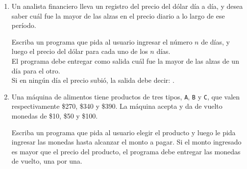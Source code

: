 \documentclass[11pt,spanish]{article}
\newcommand{\pond}[1]{[{\small\textbf{#1\%}}]}
\begin{document}
\begin{enumerate}[font=\Large\bfseries]
    \newpage
    \item
      \pond{25}
      Un analista financiero
      lleva un registro del precio del dólar día a día,
      y desea saber cuál fue la mayor de las alzas en el precio diario
      a lo largo de ese período.

      \begin{minipage}[t]{.43\textwidth}
        Escriba un programa que pida al usuario
        ingresar el número \(n\) de días,
        y luego el precio del dólar
        para cada uno de los \(n\) días.
        \\[1ex]
        El programa debe entregar como salida
        cuál fue la mayor de las alzas
        de un día para el otro.
        \\[1ex]
        Si en ningún día el precio subió,
        la salida debe decir: .
      \end{minipage}
      \hfill
      \begin{minipage}[t]{.45\textwidth}
        
      \end{minipage}

    \newpage
    \item
      \pond{25}
      Una máquina de alimentos tiene productos de tres tipos,
      \texttt{A}, \texttt{B} y \texttt{C},
      que valen respectivamente \$270, \$340 y \$390.
      La máquina acepta y da de vuelto monedas de \$10, \$50 y \$100.

      Escriba un programa que pida al usuario elegir el producto
      y luego le pida ingresar las monedas hasta alcanzar el monto a pagar.
      Si el monto ingresado es mayor que el precio del producto,
      el programa debe entregar las monedas de vuelto, una por una.

      \begin{minipage}[t]{.28\textwidth}
        
      \end{minipage}
      \hfill
      \begin{minipage}[t]{.28\textwidth}
        
      \end{minipage}
      \hfill
      \begin{minipage}[t]{.28\textwidth}
        
      \end{minipage}


\end{enumerate}
\end{document}
